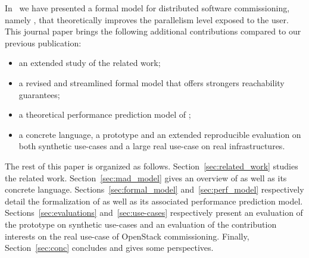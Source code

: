 In~\cite{chardet:hal-01858150} we have presented a formal model for
distributed software commissioning, namely \mad, that theoretically
improves the parallelism level exposed to the user. This journal paper
brings the following additional contributions compared to our previous
publication:
\begin{itemize}
\item an extended study of the related work;
\item a revised and streamlined \mad formal model that offers
  strongers reachability guarantees;
\item a theoretical performance prediction model of \mad;
\item a concrete language, a prototype and an extended reproducible
  evaluation on both synthetic use-cases and a large real use-case
  on real infrastructures.
\end{itemize}

The rest of this paper is organized as
follows. Section~\ref{sec:related_work} studies the related
work. Section~\ref{sec:mad_model} gives an overview of \mad as well as
its concrete language. Sections~\ref{sec:formal_model}
and~\ref{sec:perf_model} respectively detail the formalization of \mad
as well as its associated performance prediction
model. Sections~\ref{sec:evaluations} and~\ref{sec:use-cases}
respectively present an evaluation of the \mad prototype on synthetic
use-cases and an evaluation of the contribution interests on the real
use-case of OpenStack commissioning.  Finally, Section~\ref{sec:conc}
concludes and gives some perspectives.

